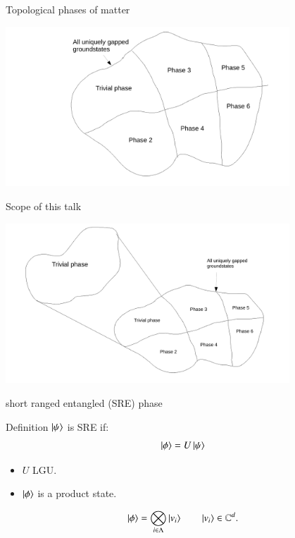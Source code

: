 \documentclass{beamer}
\begin{document}
\begin{frame}{Topological phases of matter}
	\begin{center}
		\includegraphics[trim={6cm 0 2.5cm 0},clip,width=0.8\textwidth]{Figures/GappedPhasesOfQuantumMatter.pdf}
	\end{center}
\end{frame}

\begin{frame}{Scope of this talk}
	\begin{center}
		\includegraphics[trim={1.5cm 0 2cm 0},clip,width=0.8\textwidth]{Figures/TrivialGappedPhaseOfQuantumMatter.pdf}
	\end{center}
\end{frame}

\begin{frame}{short ranged entangled (SRE) phase}
	\begin{center}
		
	\end{center}
	\pause
	\begin{block}{Definition}
		$\ket{\psi}$ is SRE if:
		\[\ket{\phi}=U\ket{\psi}\]
		\begin{itemize}
			\item $U$ LGU.
			\item $\ket{\phi}$ is a product state.
		\end{itemize}
	\end{block}
	\pause
	\[\ket{\phi}=\bigotimes_{i\in\Lambda}\ket{v_i}\qquad \ket{v_i}\in\mathbb{C}^d.\]
\end{frame}
\end{document}
